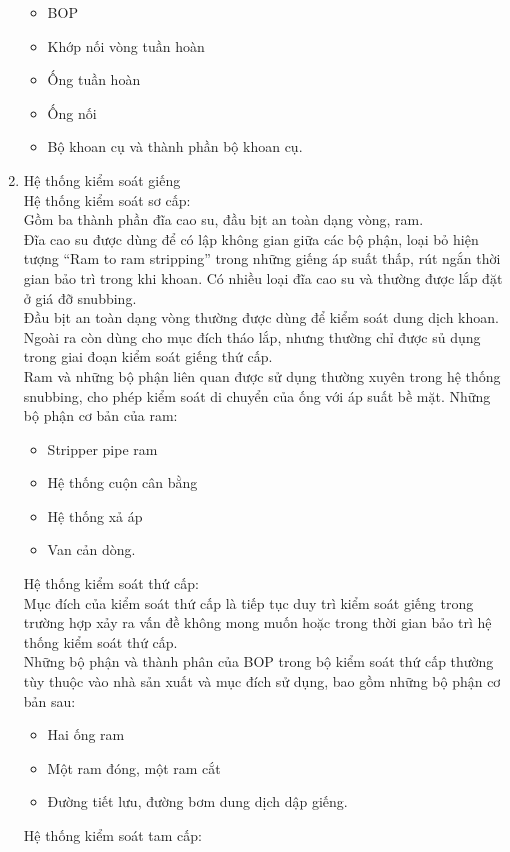 \documentclass[12pt,a4paper]{article}
\begin{document}
\begin{enumerate}
\begin{itemize}
			\item BOP
			\item Khớp nối vòng tuần hoàn
			\item Ống tuần hoàn
			\item Ống nối
			\item Bộ khoan cụ và thành phần bộ khoan cụ.
		\end{itemize}
		\item Hệ thống kiểm soát giếng \\
		Hệ thống kiểm soát sơ cấp:\\
		Gồm ba thành phần đĩa cao su, đầu bịt an toàn dạng vòng, ram.\\
		Đĩa cao su được dùng để có lập không gian giữa các bộ phận, loại bỏ hiện tượng ``Ram to ram stripping'' trong những giếng áp suất thấp, rút ngắn thời gian bảo trì trong khi khoan. Có nhiều loại đĩa cao su và thường được lắp đặt ở giá đỡ snubbing.\\
		Đầu bịt an toàn dạng vòng thường được dùng để kiểm soát dung dịch khoan. Ngoài ra còn dùng cho mục đích tháo lắp, nhưng thường chỉ được sủ dụng trong giai đoạn kiểm soát giếng thứ cấp.\\
		Ram và những bộ phận liên quan được sử dụng thường xuyên trong hệ thống snubbing, cho phép kiểm soát di chuyển của ống với áp suất bề mặt. Những bộ phận cơ bản của ram:
		\begin{itemize}
			\item Stripper pipe ram
			\item Hệ thống cuộn cân bằng
			\item Hệ thống xả áp
			\item Van cản dòng.
		\end{itemize}
		Hệ thống kiểm soát thứ cấp: \\
		Mục đích của kiểm soát thứ cấp là tiếp tục duy trì kiểm soát giếng trong trường hợp xảy ra vấn đề không mong muốn hoặc trong thời gian bảo trì hệ thống kiểm soát thứ cấp.\\
		Những bộ phận và thành phân của BOP trong bộ kiểm soát thứ cấp thường tùy thuộc vào nhà sản xuất và mục đích sử dụng, bao gồm những bộ phận cơ bản sau:
			\begin{itemize}
				\item Hai ống ram
				\item Một ram đóng, một ram cắt
				\item Đường tiết lưu, đường bơm dung dịch dập giếng.
			\end{itemize}
		Hệ thống kiểm soát tam cấp:\\

\end{enumerate}
\end{document}
